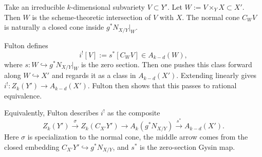 \documentclass[12pt]{article}
\begin{document}
Take an irreducible $k$-dimensional subvariety $V\subset Y'$. Let $W:=V\times_Y X\subset X'$. Then $W$ is the scheme-theoretic intersection of $V$ with $X$. The normal cone $C_WV$ is naturally a closed cone inside $g^*N_{X/Y}|_W$.

Fulton defines
$$i^![V] := s^*[C_WV]\in A_{k-d}(W),$$
where $s:W\hookrightarrow g^*N_{X/Y}|_W$ is the zero section. Then one pushes this class forward along $W\hookrightarrow X'$ and regards it as a class in $A_{k-d}(X')$. Extending linearly gives $i^!:Z_k(Y')\to A_{k-d}(X')$. Fulton then shows that this passes to rational equivalence.

Equivalently, Fulton describes $i^!$ as the composite
$$Z_k(Y') \xrightarrow{\sigma} Z_k(C_{X'}Y') \longrightarrow A_k(g^*N_{X/Y}) \xrightarrow{s^*} A_{k-d}(X').$$
Here $\sigma$ is specialization to the normal cone, the middle arrow comes from the closed embedding $C_{X'}Y'\hookrightarrow g^*N_{X/Y}$, and $s^*$ is the zero-section Gysin map. 
\end{document}
